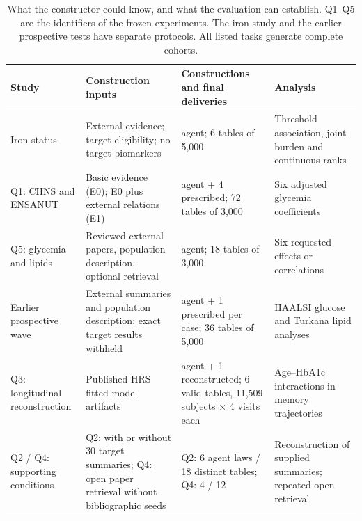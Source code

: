 \documentclass[sigconf,review]{acmart}
\begin{document}
\begin{table}[tp]

\caption{What the constructor could know, and what the evaluation can establish. Q1–\allowbreak{}Q5 are the identifiers of the frozen experiments. The iron study and the earlier prospective tests have separate protocols. All listed tasks generate complete cohorts.}

\label{tab:2}

\centering\small

\renewcommand{\arraystretch}{1.12}

\begin{tabularx}{\textwidth}{@{}>{\raggedright\arraybackslash}X>{\raggedright\arraybackslash}X>{\raggedright\arraybackslash}X>{\raggedright\arraybackslash}X@{}}

\toprule

Study & Construction inputs & Constructions and final deliveries & Analysis \\

\midrule

Iron status & External evidence; target eligibility; no target biomarkers & 2 agent; 6 tables of 5,000 & Threshold association, joint burden and continuous ranks \\

Q1: CHNS and ENSANUT & Basic evidence (E0); E0 plus external relations (E1) & 20 agent + 4 prescribed; 72 tables of 3,000 & Six adjusted glycemia coefficients \\

Q5: glycemia and lipids & Reviewed external papers, population description, optional retrieval & 6 agent; 18 tables of 3,000 & Six requested effects or correlations \\

Earlier prospective wave & External summaries and population description; exact target results withheld & 5 agent + 1 prescribed per case; 36 tables of 5,000 & HAALSI glucose and Turkana lipid analyses \\

Q3: longitudinal reconstruction & Published HRS fitted-model artifacts & 1 agent + 1 reconstructed; 6 valid tables, 11,509 subjects × 4 visits each & Age–\allowbreak{}HbA1c interactions in memory trajectories \\

Q2 / Q4: supporting conditions & Q2: with or without 30 target summaries; Q4: open paper retrieval without bibliographic seeds & Q2: 6 agent laws / 18 distinct tables; Q4: 4 / 12 & Reconstruction of supplied summaries; repeated open retrieval \\

\bottomrule

\end{tabularx}

\end{table}
\end{document}
